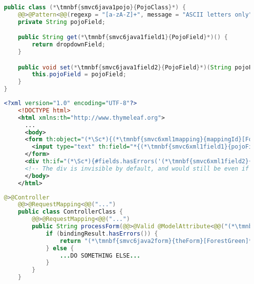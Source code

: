 \emten
{}%
\begin{lstlisting}[language=Java, title={POJO class with restricted String field}]
public class (*\tmnbf{smvc6java1pojo}{PojoClass}*) {
    @@>@Pattern<@@(regexp = "[a-zA-Z]+", message = "ASCII letters only")
    private String pojoField;

    public String get(*\tmnbf{smvc6java1field1}{PojoField}*)() {
        return dropdownField;
    }

    public void set(*\tmnbf{smvc6java1field2}{PojoField}*)(String pojoField) {
        this.pojoField = pojoField;
    }
}
\end{lstlisting}
\begin{lstlisting}[language=XML, title={HTML form \tmnbf{smvc6xml1form}{\textit{theForm}}\textit{.html} setting the field}]
    <?xml version="1.0" encoding="UTF-8"?>
    <!DOCTYPE html>
    <html xmlns:th="http://www.thymeleaf.org">
      ...
      <body>
      <form th:object="(*\Sc*){(*\tmnbf{smvc6xml1mapping}{mappingId}[ForestGreen]*)}" ...>
        <input type="text" th:field="*{(*\tmnbf{smvc6xml1field1}{pojoField}[ForestGreen]*)}">
      </form>
      <div th:if="(*\Sc*){#fields.hasErrors('(*\tmnbf{smvc6xml1field2}{pojoField}[ForestGreen]*)')}" th:errors="*{(*\tmnbf{smvc6xml1field3}{pojoField}[ForestGreen]*)}"/>
      <!-- The div is invisible by default, and would still be even if it had some content -->
      </body>
    </html>
\end{lstlisting}
\begin{lstlisting}[language=Java, title={Controller processing the form}]
    @>@Controller
    @@>@RequestMapping<@@("...")
    public class ControllerClass {
        @@>@RequestMapping<@@("...")
        public String processForm(@@>@Valid @ModelAttribute<@@("(*\tmnbf{smvc6java2mapping}{mappingId}[ForestGreen]*)") (*\tmnbf{smvc6java2pojo}{PojoClass}*) pojo, BindingResult bindingResult) {
            if (bindingResult.hasErrors()) {
                return "(*\tmnbf{smvc6java2form}{theForm}[ForestGreen]*)";
            } else {
                ...DO SOMETHING ELSE...
            }
        }
    }
\end{lstlisting}
\newpage

